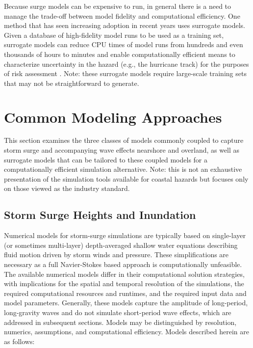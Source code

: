 Because surge models can be expensive to run, in general there is a need to manage the trade-off between model fidelity and computational efficiency. One method that has seen increasing adoption in recent years uses surrogate models. Given a database of high-fidelity model runs to be used as a training set, surrogate models can reduce CPU times of model runs from hundreds and even thousands of hours to minutes and enable computationally efficient means to characterize uncertainty in the hazard (e.g., the hurricane track) for the purposes of risk assessment \citep{kijewski-correa2014cybereye}. Note: these surrogate models require large-scale training sets that may not be straightforward to generate. 

\section{Common Modeling Approaches}
\label{sec:storm_surge_methods}

This section examines the three classes of models commonly coupled to capture storm surge and accompanying wave effects nearshore and overland, as well as surrogate models that can be tailored to these coupled models for a computationally efficient simulation alternative. Note: this is not an exhaustive presentation of the simulation tools available for coastal hazards but focuses only on those viewed as the industry standard. 

\subsection{Storm Surge Heights and Inundation}

Numerical models for storm-surge simulations are typically based on single-layer (or sometimes multi-layer) depth-averaged shallow water equations describing fluid motion driven by storm winds and pressure. These simplifications are necessary as a full Navier-Stokes based approach is computationally unfeasible. The available numerical models differ in their computational solution strategies, with implications for the spatial and temporal resolution of the simulations, the required computational resources and runtimes, and the required input data and model parameters. Generally, these models capture the amplitude of long-period, long-gravity waves and do not simulate short-period wave effects, which are addressed in subsequent sections. Models may be distinguished by resolution, numerics, assumptions, and computational efficiency. Models described herein are as follows:

